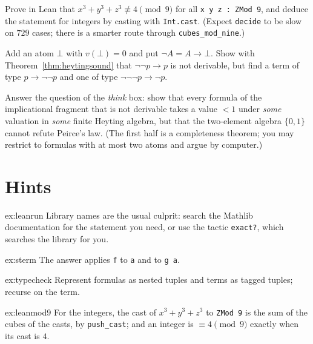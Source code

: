 \begin{exercise}[$\star\star$]\label{ex:leanmod9}
Prove in Lean that $x^3+y^3+z^3\not\equiv4\pmod9$ for all \texttt{x y z : ZMod 9}, and deduce the statement for integers by casting with \texttt{Int.cast}. (Expect \texttt{decide} to be slow on $729$ cases; there is a smarter route through \texttt{cubes\_mod\_nine}.)
\end{exercise}

\begin{exercise}[$\star\star$]\label{ex:dne}
Add an atom $\bot$ with $v(\bot)=0$ and put $\neg A=A\to\bot$. Show with Theorem~\ref{thm:heytingsound} that $\neg\neg p\to p$ is not derivable, but find a term of type $p\to\neg\neg p$ and one of type $\neg\neg\neg p\to\neg p$.
\end{exercise}

\begin{exercise}[$\star\star\star$]\label{ex:twovalue}
Answer the question of the \emph{think} box: show that every formula of the implicational fragment that is not derivable takes a value $<1$ under \emph{some} valuation in \emph{some} finite Heyting algebra, but that
the two-element algebra $\{0,1\}$ cannot refute Peirce's law. (The first half is a completeness theorem; you may restrict to formulas with at most two atoms and argue by computer.)
\end{exercise}

\section{Hints}

\begin{hint}{ex:leanrun}
Library names are the usual culprit: search the Mathlib documentation for the statement you need, or use the tactic \texttt{exact?}, which searches the library for you.
\end{hint}

\begin{hint}{ex:sterm}
The answer applies \texttt{f} to \texttt{a} and to \texttt{g a}.
\end{hint}

\begin{hint}{ex:typecheck}
Represent formulas as nested tuples and terms as tagged tuples; recurse on the term.
\end{hint}

\begin{hint}{ex:leanmod9}
For the integers, the cast of $x^3+y^3+z^3$ to \texttt{ZMod 9} is the sum of the cubes of the casts, by \texttt{push\_cast}; and an integer is $\equiv4\pmod9$ exactly when its cast is $4$.
\end{hint}

